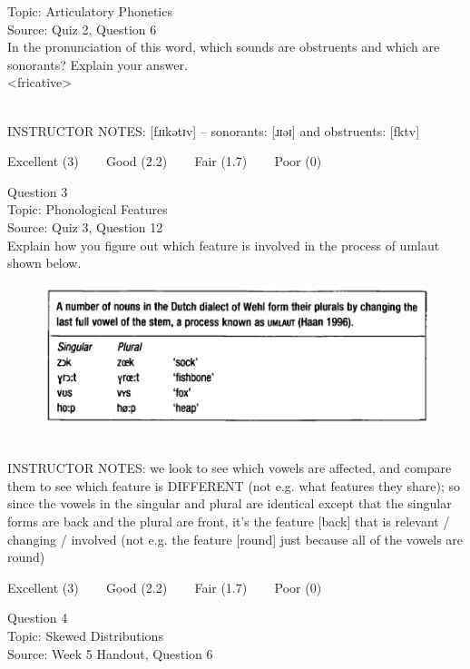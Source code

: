 \documentclass[12pt]{article}
\begin{document}
Topic: Articulatory Phonetics\\
Source: Quiz 2, Question 6\\

In the pronunciation of this word, which sounds are obstruents and which are sonorants? Explain your answer.\\

<fricative>


~\\
INSTRUCTOR NOTES: [fɹɪkətɪv] -- sonorants: [ɹɪəɪ] and obstruents: [fktv]


\vfill
Excellent (3) ~~~ Good (2.2) ~~~ Fair (1.7) ~~~ Poor (0)
\newpage

{\large Question 3}\\

Topic: Phonological Features\\
Source: Quiz 3, Question 12\\

Explain how you figure out which feature is involved in the process of umlaut shown below.\\

\begin{figure}[H]
\includegraphics{../images/dutch.png}
\end{figure}

~\\
INSTRUCTOR NOTES: we look to see which vowels are affected, and compare them to see which feature is DIFFERENT (not e.g. what features they share); so since the vowels in the singular and plural are identical except that the singular forms are back and the plural are front, it's the feature [back] that is relevant / changing / involved (not e.g. the feature [round] just because all of the vowels are round)


\vfill
Excellent (3) ~~~ Good (2.2) ~~~ Fair (1.7) ~~~ Poor (0)
\newpage

{\large Question 4}\\

Topic: Skewed Distributions\\
Source: Week 5 Handout, Question 6\\
\end{document}
